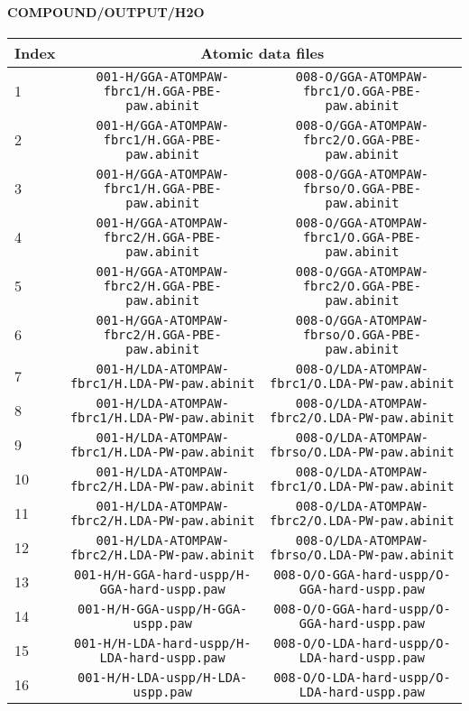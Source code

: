 \documentclass[onecolumn]{revtex4}
\begin{document}
\paragraph*{\bf{COMPOUND/OUTPUT/H2O}}
\begin{center}
\begin{tabular}{lcc}
\hline
Index & \multicolumn{2}{c}{Atomic data files} \\
\hline
1 & \verb?001-H/GGA-ATOMPAW-fbrc1/H.GGA-PBE-paw.abinit? & \verb?008-O/GGA-ATOMPAW-fbrc1/O.GGA-PBE-paw.abinit? \\
2 & \verb?001-H/GGA-ATOMPAW-fbrc1/H.GGA-PBE-paw.abinit? & \verb?008-O/GGA-ATOMPAW-fbrc2/O.GGA-PBE-paw.abinit? \\
3 & \verb?001-H/GGA-ATOMPAW-fbrc1/H.GGA-PBE-paw.abinit? & \verb?008-O/GGA-ATOMPAW-fbrso/O.GGA-PBE-paw.abinit? \\
4 & \verb?001-H/GGA-ATOMPAW-fbrc2/H.GGA-PBE-paw.abinit? & \verb?008-O/GGA-ATOMPAW-fbrc1/O.GGA-PBE-paw.abinit? \\
5 & \verb?001-H/GGA-ATOMPAW-fbrc2/H.GGA-PBE-paw.abinit? & \verb?008-O/GGA-ATOMPAW-fbrc2/O.GGA-PBE-paw.abinit? \\
6 & \verb?001-H/GGA-ATOMPAW-fbrc2/H.GGA-PBE-paw.abinit? & \verb?008-O/GGA-ATOMPAW-fbrso/O.GGA-PBE-paw.abinit? \\
7 & \verb?001-H/LDA-ATOMPAW-fbrc1/H.LDA-PW-paw.abinit? & \verb?008-O/LDA-ATOMPAW-fbrc1/O.LDA-PW-paw.abinit? \\
8 & \verb?001-H/LDA-ATOMPAW-fbrc1/H.LDA-PW-paw.abinit? & \verb?008-O/LDA-ATOMPAW-fbrc2/O.LDA-PW-paw.abinit? \\
9 & \verb?001-H/LDA-ATOMPAW-fbrc1/H.LDA-PW-paw.abinit? & \verb?008-O/LDA-ATOMPAW-fbrso/O.LDA-PW-paw.abinit? \\
10 & \verb?001-H/LDA-ATOMPAW-fbrc2/H.LDA-PW-paw.abinit? & \verb?008-O/LDA-ATOMPAW-fbrc1/O.LDA-PW-paw.abinit? \\
11 & \verb?001-H/LDA-ATOMPAW-fbrc2/H.LDA-PW-paw.abinit? & \verb?008-O/LDA-ATOMPAW-fbrc2/O.LDA-PW-paw.abinit? \\
12 & \verb?001-H/LDA-ATOMPAW-fbrc2/H.LDA-PW-paw.abinit? & \verb?008-O/LDA-ATOMPAW-fbrso/O.LDA-PW-paw.abinit? \\
13 & \verb?001-H/H-GGA-hard-uspp/H-GGA-hard-uspp.paw? & \verb?008-O/O-GGA-hard-uspp/O-GGA-hard-uspp.paw? \\
14 & \verb?001-H/H-GGA-uspp/H-GGA-uspp.paw? & \verb?008-O/O-GGA-hard-uspp/O-GGA-hard-uspp.paw? \\
15 & \verb?001-H/H-LDA-hard-uspp/H-LDA-hard-uspp.paw? & \verb?008-O/O-LDA-hard-uspp/O-LDA-hard-uspp.paw? \\
16 & \verb?001-H/H-LDA-uspp/H-LDA-uspp.paw? & \verb?008-O/O-LDA-hard-uspp/O-LDA-hard-uspp.paw? \\
\hline
\end{tabular}
\end{center}
\end{document}
